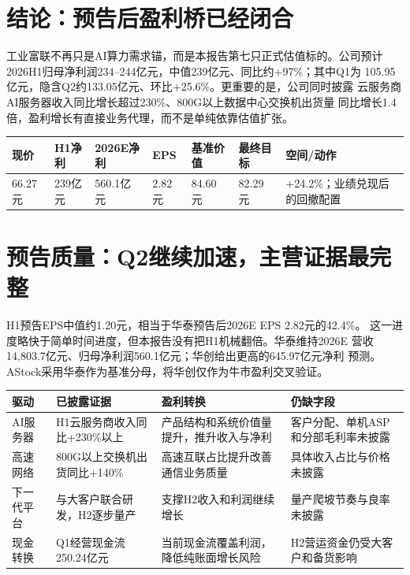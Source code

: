 
\section{结论：预告后盈利桥已经闭合}

工业富联不再只是AI算力需求锚，而是本报告第七只正式估值标的。公司预计
2026H1归母净利润234--244亿元，中值239亿元、同比约+97\%；其中Q1为
105.95亿元，隐含Q2约133.05亿元、环比+25.6\%。更重要的是，公司同时披露
云服务商AI服务器收入同比增长超过230\%、800G以上数据中心交换机出货量
同比增长1.4倍，盈利增长有直接业务代理，而不是单纯依靠估值扩张。

\begin{dashboardbox}
\begin{tabularx}{\textwidth}{L{2.4cm}R{1.7cm}R{1.7cm}R{1.7cm}R{1.7cm}R{1.8cm}X}
\toprule
\textbf{现价} & \textbf{H1净利} & \textbf{2026E净利} & \textbf{EPS} &
\textbf{基准价值} & \textbf{最终目标} & \textbf{空间/动作} \\
\midrule
66.27元 & 239亿元 & 560.1亿元 & 2.82元 & 84.60元 & 82.29元 &
+24.2\%；业绩兑现后的回撤配置 \\
\bottomrule
\end{tabularx}
\end{dashboardbox}

\section{预告质量：Q2继续加速，主营证据最完整}

H1预告EPS中值约1.20元，相当于华泰预告后2026E EPS 2.82元的42.4\%。
这一进度略快于简单时间进度，但本报告没有把H1机械翻倍。华泰维持2026E
营收14,803.7亿元、归母净利润560.1亿元；华创给出更高的645.97亿元净利
预测。AStock采用华泰作为基准分母，将华创仅作为牛市盈利交叉验证。

\begin{exhibitbox}
\begin{tabularx}{\textwidth}{L{3.0cm}L{3.0cm}L{3.2cm}X}
\toprule
\textbf{驱动} & \textbf{已披露证据} & \textbf{盈利转换} & \textbf{仍缺字段} \\
\midrule
AI服务器 & H1云服务商收入同比+230\%以上 & 产品结构和系统价值量提升，推升收入与净利 &
客户分配、单机ASP和分部毛利率未披露 \\
高速网络 & 800G以上交换机出货同比+140\% & 高速互联占比提升改善通信业务质量 &
具体收入占比与价格未披露 \\
下一代平台 & 与大客户联合研发，H2逐步量产 & 支撑H2收入和利润继续增长 &
量产爬坡节奏与良率未披露 \\
现金转换 & Q1经营现金流250.24亿元 & 当前现金流覆盖利润，降低纯账面增长风险 &
H2营运资金仍受大客户和备货影响 \\
\bottomrule
\end{tabularx}
\end{exhibitbox}

